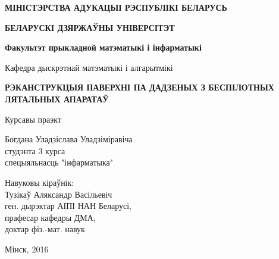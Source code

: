 \begin{titlepage}
    \begin{center}
        {\bf МІНІСТЭРСТВА АДУКАЦЫІ РЭСПУБЛІКІ БЕЛАРУСЬ}
    \end{center}
    \begin{center}
        {\bf БЕЛАРУСКІ ДЗЯРЖАЎНЫ УНІВЕРСІТЭТ}
    \end{center}
    \begin{center}
        {\bf Факультэт прыкладной матэматыкі і інфарматыкі}
    \end{center}
    \begin{center}
        Кафедра дыскрэтнай матэматыкі і алгарытмікі
    \end{center}
    
    \vspace{8em}
    
    \begin{center}
        {\bf РЭКАНСТРУКЦЫЯ ПАВЕРХНІ ПА ДАДЗЕНЫХ З БЕСПІЛОТНЫХ ЛЯТАЛЬНЫХ АПАРАТАЎ}
    \end{center}
    
    \vspace{2em}
    
    \begin{center}
        Курсавы праэкт
    \end{center}
    
    \vspace{3em}
    
    \begin{flushright}
        Богдана Уладзіслава Уладзіміравіча\\
        студэнта 3 курса\\
        спецыяльнасць "інфарматыка"\\
    \end{flushright}
    
    \vspace{1em}
    
    \begin{flushright}
        Навуковы кіраўнік:\\
        Тузікаў Аляксандр Васільевіч\\
        ген. дырэктар АІПІ НАН Беларусі,\\
        прафесар кафедры ДМА,\\
        доктар фіз.-мат. навук\\
    \end{flushright}
    
    \vfill
    
    \begin{center}
        Мінск, 2016
    \end{center}
\end{titlepage}
\newpage
